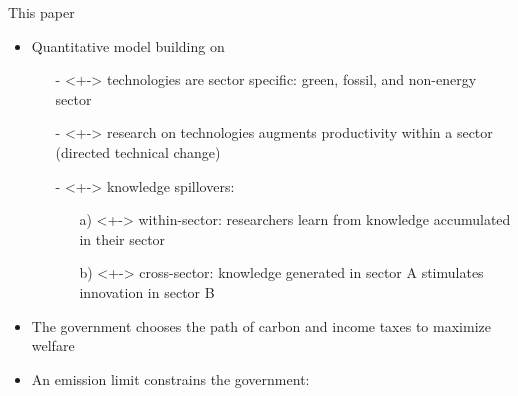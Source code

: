 \documentclass[11pt,aspectratio=169]{beamer}
\begin{document}
\begin{frame}{This paper}
	\vspace{-4mm}
	\begin{itemize}
		\item<+-> Quantitative model building on \cite{Fried2018ClimateAnalysis} 
		\vspace{2mm}
		\begin{itemize}
			\item[-]<+-> \alert{technologies are sector specific}: green, fossil, and non-energy sector 
			\vspace{1mm}
			\item[-]<+-> \alert{research} on technologies augments productivity within a sector \\ \footnotesize{(directed technical change) }
			\vspace{1mm}
			\item[-]<+-> \alert{knowledge spillovers}: 
			\begin{enumerate}
				\item[a)]<+-> \alert{within-sector}: researchers learn from knowledge accumulated in their sector
				\item[b)]<+-> \alert{cross-sector}: knowledge generated in sector A stimulates innovation in sector B
			\end{enumerate}%
		\end{itemize}
		\vspace{2mm}
		\item<+->   The government   chooses the \alert{path of carbon and income taxes} to maximize welfare\vspace{2mm}
		\item<+-> An \alert{emission limit} constrains the government: 
	\end{itemize}
	\pause
	\vspace{0mm}
	\centering
\end{frame}
\end{document}
